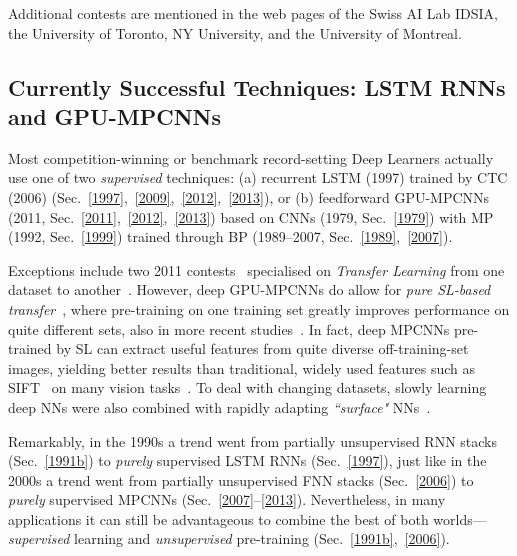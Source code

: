 \documentclass[letterpaper]{article}
\begin{document}
\begin{sloppypar}
Additional contests are mentioned in the web pages of
the Swiss AI Lab IDSIA,
the University of Toronto,
NY University,
and the University of Montreal.


\subsection{Currently Successful Techniques: LSTM RNNs and GPU-MPCNNs}
\label{dominant}

Most competition-winning or benchmark record-setting Deep Learners actually use one of two {\em supervised} techniques: (a) recurrent LSTM (1997)  trained by CTC (2006) (Sec.~\ref{1997},~\ref{2009},~\ref{2012},~\ref{2013}), or (b) 
 feedforward GPU-MPCNNs (2011, Sec.~\ref{2011},~\ref{2012},~\ref{2013})
based on CNNs (1979, Sec.~\ref{1979}) with MP (1992, Sec.~\ref{1999}) 
trained through BP (1989--2007, Sec.~\ref{1989},~\ref{2007}).

Exceptions include two 2011 contests~\citep{goodfellow2011,transfer2011,goodfellow:2012icml} specialised on {\em Transfer 
Learning} from one dataset to another~\citep[e.g.,][]{caruana1997,Schmidhuber:04oops,transfer2010}.
However, deep GPU-MPCNNs do allow for {\em pure SL-based transfer}~\citep{Ciresan:2012a}, 
where pre-training
on one training set greatly improves performance on quite different sets,
also in more recent studies~\citep{oquab2013,donahue2013}. 
In fact, deep MPCNNs pre-trained by SL  can extract useful 
features from quite diverse off-training-set images, yielding better results than traditional, 
widely used features 
such as SIFT~\citep{Lowe:1999,Lowe:04} on many vision tasks~\citep{razavian2014}.
To deal with changing datasets, 
slowly learning deep NNs were also combined with  
rapidly adapting {\em ``surface"} NNs~\citep{kak2010}.


Remarkably, 
in the 1990s a trend went from partially unsupervised RNN stacks (Sec.~\ref{1991b}) to {\em purely} supervised LSTM RNNs (Sec.~\ref{1997}), just like in the 2000s a trend went from partially unsupervised FNN stacks (Sec.~\ref{2006}) to {\em purely} supervised MPCNNs 
(Sec.~\ref{2007}--\ref{2013}).
Nevertheless, in many applications it can still be advantageous to combine the best of both worlds---{\em supervised} learning and {\em unsupervised} pre-training (Sec.~\ref{1991b},~\ref{2006}).




\end{sloppypar}
\end{document}
